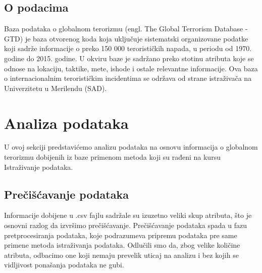 \documentclass[a4paper]{article}
\begin{document}
\subsection{O podacima}
Baza podataka o globalnom terorizmu (engl. The Global Terrorism Database - GTD) je baza otvorenog koda koja uključuje sistematski organizovane podatke koji sadrže informacije o preko 150 000 terorističkih napada, u periodu od 1970. godine do 2015. godine. U okviru baze je sadržano preko stotinu atributa koje se odnose na lokaciju, taktike, mete, ishode i ostale relevantne informacije. Ova baza o internacionalnim terorističkim incidentima se održava od strane istraživača na Univerzitetu u Merilendu (SAD).

\newpage
\section{Analiza podataka}
\label{sec:analiza}

U ovoj sekciji predstavićemo analizu podataka na osnovu informacija o globalnom terorizmu dobijenih iz baze primenom metoda koji su rađeni na kursu Istraživanje podataka. 

\subsection{Prečišćavanje podataka}

Informacije dobijene u .csv fajlu sadržale su izuzetno veliki skup atributa, što je osnovni razlog da izvršimo prečišćavanje. Prečišćavanje podataka spada u fazu pretprocesiranja podataka, koje podrazumeva pripremu podataka pre same primene metoda istraživanja podataka. Odlučili smo da, zbog velike količine atributa, odbacimo one koji nemaju prevelik uticaj na analizu i bez kojih se vidljivost ponašanja podataka ne gubi.
\end{document}
